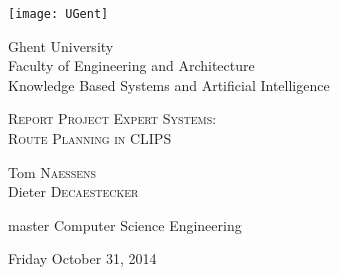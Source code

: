 \begin{titlepage}

\fontsize{12pt}{14pt}
\selectfont

\begin{center}
\texttt{[image: UGent]}

\vspace{1.5cm}
Ghent University \\
Faculty of Engineering and Architecture \\
Knowledge Based Systems and Artificial Intelligence \\


\vspace{4.0cm}

\fontsize{17.28pt}{21pt}
\selectfont

\textsc{{\Large Report Project Expert Systems:}\\
 Route Planning in CLIPS}

\fontsize{12pt}{14pt}
\selectfont

\vspace{.6cm}

{\Large 
	Tom \textsc{Naessens} \hfill \\
	Dieter \textsc{Decaestecker} \hfill \\
} 

\vspace{.6cm}

{ \large
	 master Computer Science Engineering
}

\vspace{0.4cm}

Friday October 31, 2014
\end{center}

\vspace{5.5cm}


\end{titlepage}

\thispagestyle{empty}
